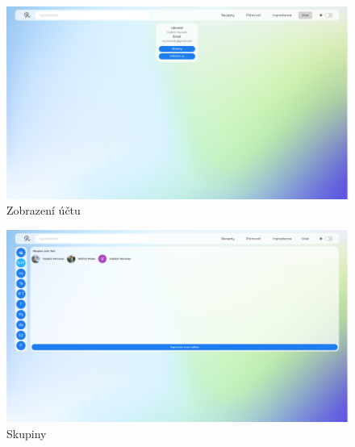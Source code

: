 \vspace*{\fill}
\begin{figure}[H]
    \includegraphics[width=\textwidth]{images/final-look/ucet}
    \caption{Zobrazení účtu} \label{picture:recipeo:ucet}
\end{figure}

\begin{figure}[H]
    \includegraphics[width=\textwidth]{images/final-look/skupiny}
    \caption{Skupiny} \label{picture:recipeo:skupiny}
\end{figure}
\vspace*{\fill}
\clearpage
